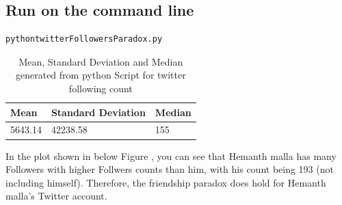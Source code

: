 \documentclass[letterpaper,11pt]{article}
\begin{document}
\subsection*{Run on the command line}
\begin{lstlisting}[frame=single]
pythontwitterFollowersParadox.py
\end{lstlisting}

\begin{table}[htb]
\centering
\begin{tabular}{ | l | l | l |}
\hline
\textbf{Mean} & \textbf{Standard Deviation} & \textbf{Median} \\
\hline
5643.14 & 42238.58 & 155 \\
\hline
\end{tabular}
\caption{Mean, Standard Deviation and Median generated from python Script for twitter following count}
\label{table:summaryExtra}
\end{table}
In the plot shown in below  Figure , you can see that Hemanth malla has many Followers with higher Follwers counts than him, with his count being 193 (not including himself). Therefore, the friendship paradox does hold for Hemanth malla's Twitter account.
\end{document}
